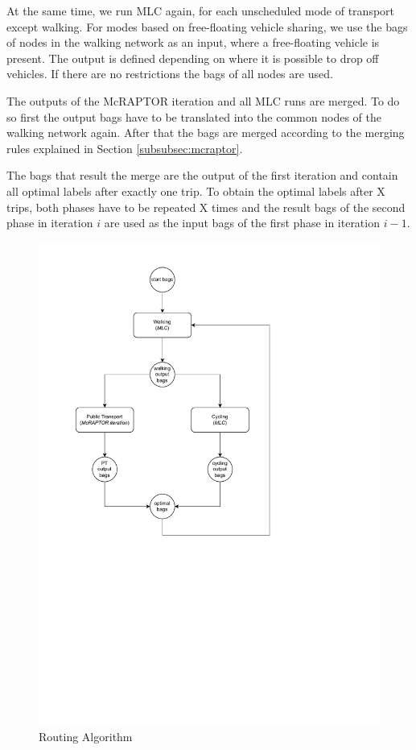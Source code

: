 At the same time, we run MLC again, for each unscheduled mode of transport except walking.
For modes based on free-floating vehicle sharing, we use the bags of nodes in the walking network as an input, where a free-floating vehicle is present.
The output is defined depending on where it is possible to drop off vehicles.
If there are no restrictions the bags of all nodes are used.

The outputs of the McRAPTOR iteration and all MLC runs are merged.
To do so first the output bags have to be translated into the common nodes of the walking network again.
After that the bags are merged according to the merging rules explained in Section \ref{subsubsec:mcraptor}.

The bags that result the merge are the output of the first iteration and contain all optimal labels after exactly one trip.
To obtain the optimal labels after X trips, both phases have to be repeated X times and the result bags of the second phase in iteration \(i\) are used as the input bags of the first phase in iteration \(i-1\).


\begin{figure}
    \centering
    \includegraphics[scale=0.75]{Figures/method/routing_algorithm}
    \caption{Routing Algorithm}
    \label{fig:routing_algorithm}
\end{figure}

